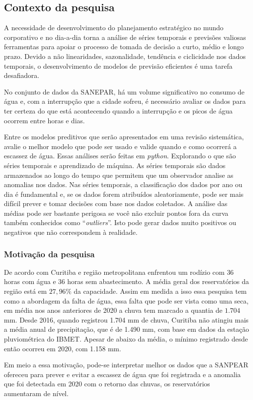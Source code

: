 \subsection{Contexto da pesquisa} \label{subsec:contexto}
 A necessidade de desenvolvimento do planejamento estratégico no mundo corporativo e no dia-a-dia torna a análise de séries temporais e previsões valiosas ferramentas para apoiar o processo de tomada de decisão a curto, médio e longo prazo. Devido a não linearidades, sazonalidade, tendência e ciclicidade nos dados temporais, o desenvolvimento de modelos de previsão eficientes é uma tarefa desafiadora. 

No conjunto de dados da SANEPAR, há um volume significativo no consumo de água e, com a interrupção que a cidade sofreu, é necessário avaliar os dados para ter certeza do que está acontecendo quando a interrupção e os picos de água ocorrem entre horas e dias.

Entre os modelos preditivos que serão apresentados em uma revisão sistemática, avalie o melhor modelo que pode ser usado e valide quando e como ocorrerá a escassez de água. Essas análises serão feitas em \textit{python}.
Explorando o que são séries temporais e aprendizado de máquina. As séries temporais são dados armazenados ao longo do tempo que permitem que um observador analise as anomalias nos dados. Nas séries temporais, a classificação dos dados por ano ou dia é fundamental e, se os dados forem atribuídos aleatoriamente, pode ser mais difícil prever e tomar decisões com base nos dados coletados. 
A análise das médias pode ser bastante perigosa se você não excluir pontos fora da curva também conhecidos como ``\textit{outliers}''. Isto pode gerar dados muito positivos ou negativos que não correspondem à realidade.
   
      
\subsubsection{Motiva\c c\~ao da pesquisa} \label{subsubsec:motivacao}
    
    De acordo com \cite{vasconcelos_2020} Curitiba e região metropolitana enfrentou um rodízio com $36$ horas com água e $36$ horas sem abastecimento. A média geral dos reservatórios da região está em $27,96\%$ da capacidade. Assim em medida a isso essa pesquisa tem como a abordagem da falta de água, essa falta que pode ser vista como uma seca, em média nos anos anteriores de 2020 a chuva tem marcado a quantia de $1.704$ mm. \cite{vasconcelos_2020} Desde 2016, quando registrou 1.704 mm de chuva, Curitiba não atingiu mais a média anual de precipitação, que é de 1.490 mm, com base em dados da estação pluviométrica do IBMET.  Apesar de abaixo da média, o mínimo registrado desde então ocorreu em 2020, com 1.158 mm.
    
    Em meio a essa motivação, pode-se interpretar melhor os dados que a SANPEAR ofereceu para prever e evitar a escassez de água que foi registrada e a anomalia que foi detectada em 2020 com o retorno das chuvas, os reservatórios aumentaram de nível.
    
    